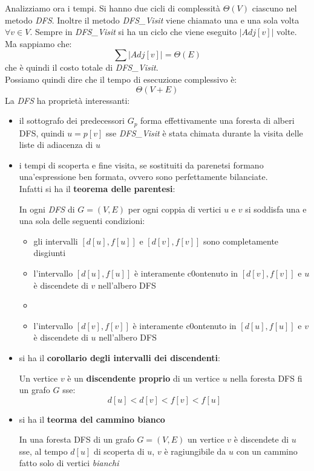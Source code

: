 \documentclass[a4paper,12pt, oneside]{book}
\begin{document}
Analizziamo ora i tempi. Si hanno due cicli di complessità
$\Theta(V)$ ciascuno nel metodo \textit{DFS}. Inoltre il metodo
\textit{DFS\_Visit} viene chiamato una e una sola volta $\forall v\in
V$. Sempre in \textit{DFS\_Visit} si ha un ciclo che viene eseguito
$\vert Adj[v]\vert$ volte. Ma sappiamo che:
\[\sum \vert Adj[v]\vert=\Theta(E)\]
che è quindi il costo totale di \textit{DFS\_Visit}.\\
Possiamo quindi dire che il tempo di esecuzione complessivo è:
\[\Theta(V+E)\]
La \textit{DFS} ha proprietà interessanti:
\begin{itemize}
  \item il sottografo dei predecessori $G_p$ forma effettivamente una
  foresta di alberi DFS, quindi $u=p[v]$ sse \textit{DFS\_Visit} è
  stata chimata durante la visita delle liste di adiacenza di $u$
  \item i tempi di scoperta e fine visita, se sostituiti da parenetsi
  formano una'espressione ben formata, ovvero sono perfettamente
  bilanciate.
  \\ Infatti si ha il \textbf{teorema delle parentesi}:
  \begin{teorema}
    In ogni \textit{DFS} di $G=(V,E)$ per ogni coppia di vertici $u$ e
    $v$ si soddisfa una e una sola delle seguenti condizioni:
    \begin{itemize}
      \item gli intervalli $[d[u],f[u]]$ e $[d[v],f[v]]$ sono
      completamente disgiunti
      \item l'intervallo $[d[u],f[u]]$ è interamente c0ontenuto in
      $[d[v],f[v]]$ e $u$ è discendete di $v$ nell'albero DFS
      \item \item l'intervallo $[d[v],f[v]]$ è interamente c0ontenuto in
      $[d[u],f[u]]$ e $v$ è discendete di $u$ nell'albero DFS
    \end{itemize}
  \end{teorema}
  \item si ha il \textbf{corollario degli intervalli dei
    discendenti}:
  \begin{corollario}
    Un vertice $v$ è un \textbf{discendente proprio} di un vertice $u$ nella
    foresta DFS fi un grafo $G$ sse:
    \[d[u]<d[v]<f[v]<f[u]\]
  \end{corollario}
  \item si ha il \textbf{teorma del cammino bianco}
  \begin{teorema}
    In una foresta DFS di un grafo $G=(V,E)$ un vertice $v$ è
    discendete di $u$ sse, al tempo $d[u]$ di scoperta di $u$, $v$ è
    ragiungibile da $u$ con un cammino fatto solo di vertici
    \textit{bianchi} 
  \end{teorema} 
\end{itemize}
\end{document}
